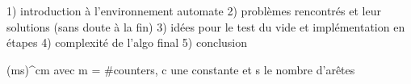 1) introduction à l'environnement automate
2) problèmes rencontrés et leur solutions (sans doute à la fin)
3) idées pour le test du vide et implémentation en étapes
4) complexité de l'algo final
5) conclusion

(ms)^cm avec m = #counters, c une constante et s le nombre d'arêtes